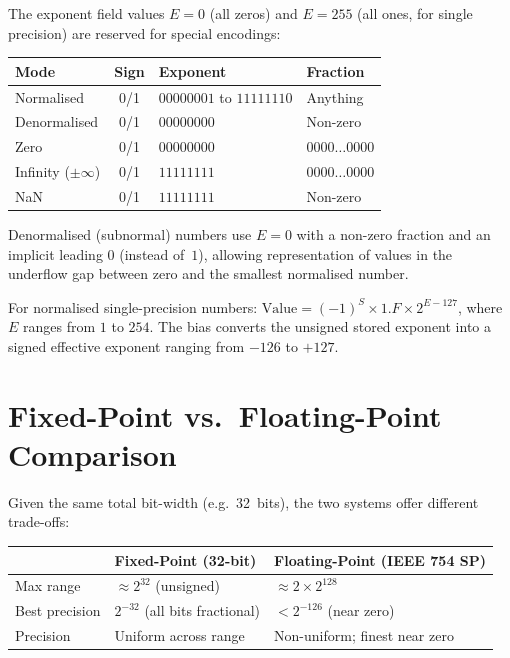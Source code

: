 \documentclass[11pt, a4paper, notitlepage]{report}
\theoremstyle{definition}
\theoremstyle{remark}
\theoremstyle{definition}
\begin{document}
The exponent field values $E = 0$ (all zeros) and $E = 255$ (all ones, for single precision) are reserved for special encodings:

\medskip
{\small
\begin{tabularx}{0.95\linewidth}{l c l X}
  \toprule
  \textbf{Mode} & \textbf{Sign} & \textbf{Exponent} & \textbf{Fraction} \\
  \midrule
  Normalised & 0/1 & $00000001$ to $11111110$ & Anything \\
  Denormalised & 0/1 & $00000000$ & Non-zero \\
  Zero & 0/1 & $00000000$ & $0000\ldots0000$ \\
  Infinity ($\pm\infty$) & 0/1 & $11111111$ & $0000\ldots0000$ \\
  NaN & 0/1 & $11111111$ & Non-zero \\
  \bottomrule
\end{tabularx}
}%
\medskip

Denormalised (subnormal) numbers use $E = 0$ with a non-zero fraction and an implicit leading \textbf{$0$} (instead of~$1$), allowing representation of values in the underflow gap between zero and the smallest normalised number.

\begin{keyresult}[title={Key Result: IEEE 754 Value Formula}]
  For normalised single-precision numbers:
  $\text{Value} = (-1)^S \times 1.F \times 2^{E-127}$,
  where $E$ ranges from $1$ to $254$. The bias converts the unsigned stored exponent into a signed effective exponent ranging from $-126$ to $+127$.
\end{keyresult}


\section{Fixed-Point vs.\ Floating-Point Comparison}
\label{sec:fixed-vs-float}

Given the same total bit-width (e.g.\ 32~bits), the two systems offer different trade-offs:

\medskip
{\small
\begin{tabularx}{0.95\linewidth}{l X X}
  \toprule
  & \textbf{Fixed-Point (32-bit)} & \textbf{Floating-Point (IEEE 754 SP)} \\
  \midrule
  Max range & $\approx 2^{32}$ (unsigned) & $\approx 2 \times 2^{128}$ \\
  Best precision & $2^{-32}$ (all bits fractional) & $< 2^{-126}$ (near zero) \\
  Precision & Uniform across range & Non-uniform; finest near zero \\
  \bottomrule
\end{tabularx}
}%
\medskip
\end{document}
